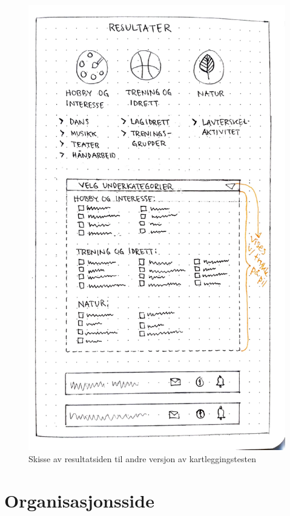 \begin{figure}[H]
\centering
\includegraphics[width=.7\textwidth]{Illustrasjoner/Skisser-pdf/1.0/1-12-kartlegging-spm-resultater.pdf}
\caption{Skisse av resultatsiden til andre versjon av kartleggingstesten}
\label{vedlegg:1-12-kartlegging-spm-res}
\end{figure}

\section{Organisasjonsside}

